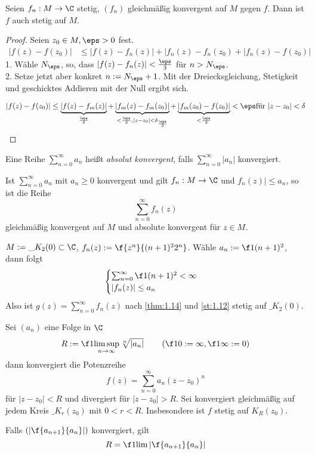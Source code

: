 \documentclass[a4paper,10pt]{scrartcl}
\begin{document}
\begin{st}
	\label{st:1.12}
	Seien $f_n:M\to \C$ stetig, $(f_n)$ gleichmäßig konvergent auf $M$ gegen $f$. 
	Dann ist $f$ auch stetig auf $M$.
	\begin{proof}
		Seien $z_0\in M, \eps > 0$ fest.
		\begin{align*}
			|f(z)-f(z_0)| &\le |f(z)-f_n(z)| + |f_n(z)-f_n(z_0) + |f_n(z)-f(z_0)|
		\end{align*}
		1. Wähle $N_{\eps}$, so, dass $|f(z)-f_n(z)| < \frac \eps 3$ für $n>N_{\eps}$. \\
		2. Setze jetzt aber konkret $n:= N_{\eps}+1$. Mit der Dreiecksgleichung, Stetigkeit und geschicktes Addieren mit der Null ergibt sich.
		
		 \[
		  |f(z)-f(z_0)|\le \underbrace{|f(z)-f_m(z)|}_{\frac\eps 3} + \underbrace{|f_m(z)-f_m(z_0)|}_{<\frac \eps 3, |z-z_0|<\delta_{\frac{\eps}{3}}}+\underbrace{|f_m(z_0)-f(z_0)|}_{<\frac{\eps}{3}}<\eps \text{für } |z-z_0|<\delta
		 \]
			
	\end{proof}
\end{st}

\begin{df}
	\label{df:1.13}
	Eine Reihe $\sum_{n=0}^\infty a_n$ heißt \emph{absolut konvergent}, falls $\sum_{n=0}^\infty |a_n|$ konvergiert.
\end{df}

\begin{thm}
	\label{thm:1.14}
	Ist $\sum_{n=0}^\infty a_n$ mit $a_n \ge 0$ konvergent und gilt $f_n:M\to \C$ und $f_n(z)| \le a_n$, so ist die Reihe
	\[
		\sum_{n=0}^\infty f_n(z)
	\]
	gleichmäßig konvergent auf $M$ und absolute konvergent für $z\in M$.
\end{thm}

\begin{ex}
	$M:= \_{K_2(0)} \subset \C$, $f_n(z) := \f {z^n}{(n+1)^22^n}$.
	Wähle $a_n:= \f 1{(n+1)^2}$, dann folgt
	\[
		\begin{cases}
			\sum_{n=0}^\infty \f 1{(n+1)^2} < \infty \\
			|f_n(z)| \le a_n
		\end{cases}
	\]
	Also ist $g(z) = \sum_{n=0}^\infty f_n(z)$ nach \ref{thm:1.14} und \ref{st:1.12} stetig auf $\_{K_2(0)}$.
\end{ex}

\begin{df}[Potenzreihen]
	Sei $(a_n)$ eine Folge in $\C$
	\[
		R := \f 1{\limsup_{n\to \infty}\sqrt[n]{|a_n|}} \qquad\left (\f 10 := \infty, \f 1\infty := 0 \right )
	\]
	dann konvergiert die Potenzreihe
	\[
		f(z) = \sum_{n=0}^\infty a_n(z-z_0)^n
	\]
	für $|z-z_0|<R$ und divergiert für $|z-z_0|>R$.
	Sei konvergiert gleichmäßig auf jedem Kreis $\_{K_r(z_0)}$ mit $0<r<R$.
	Insbesondere ist $f$ stetig auf $K_R(z_0)$.

	Falls $(|\f {a_{n+1}}{a_n}|)$ konvergiert, gilt
	\[
		R = \f 1{\lim |\f{a_{n+1}}{a_n}|}
	\]
\end{df}
\end{document}
